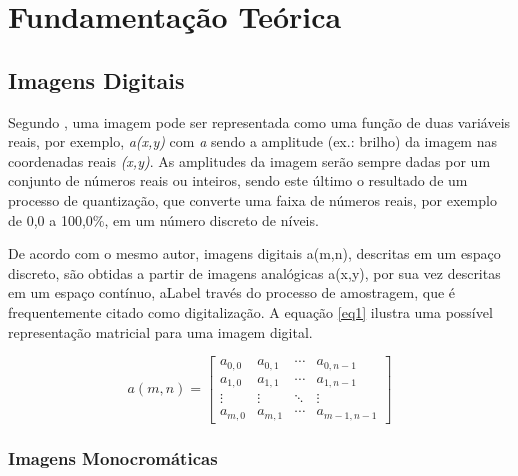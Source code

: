 \chapter[Fundamentação Teórica]{Fundamentação Teórica}

\section{Imagens Digitais}

Segundo , uma imagem pode ser representada como uma função de duas variáveis reais, por exemplo, \textit{a(x,y)} com \textit{a} sendo a amplitude (ex.: brilho) da imagem nas coordenadas reais \textit{(x,y)}. As amplitudes da imagem serão sempre dadas por um conjunto de números reais ou inteiros, sendo este último o resultado de um processo de quantização, que converte uma faixa de números reais, por exemplo de 0,0 a 100,0\%, em um número discreto de níveis.

De acordo com o mesmo autor, imagens digitais a(m,n), descritas em um espaço discreto, são obtidas a partir de imagens analógicas a(x,y), por sua vez descritas em um espaço contínuo,  aLabel través do processo de amostragem, que é frequentemente citado como digitalização. A equação \ref{eq1} ilustra uma possível representação matricial para uma imagem digital.
\vspace{-1cm}
\begin{center}
	\begin{equation}
	a(m,n) =
	\begin{bmatrix}
  		a_{0,0} & a_{0,1} & \cdots & a_{0,n-1} \\
  		a_{1,0} & a_{1,1} & \cdots & a_{1,n-1} \\
  		\vdots  & \vdots  & \ddots & \vdots  \\
  		a_{m,0} & a_{m,1} & \cdots & a_{m-1,n-1}
	\end{bmatrix}
	\label{eq1} 
	\end{equation}
\end{center}


\subsection{Imagens Monocromáticas}
	
